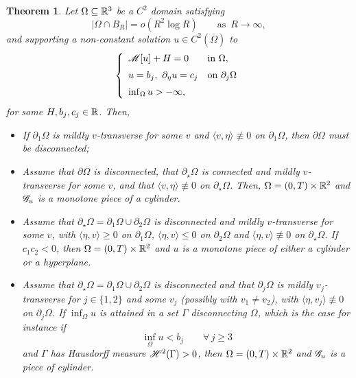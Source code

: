 \documentclass[10 pt,a4paper]{article}
\newtheorem{theorem}[definition]{Theorem}
\theoremstyle{definition}
\begin{document}
\begin{theorem}\label{teo_CMC_intro_R3}
	Let $\Omega \subseteq \mathbb R^3$ be a $C^2$ domain satisfying
	\begin{equation}\label{eq_quadraticgrowth}
		|\Omega \cap B_R| = o(R^2 \log R) \qquad \text{as } \, R \to \infty,
	\end{equation}
	and supporting a non-constant solution $u \in C^2(\overline\Omega)$ to 
	\[
		\left\{ 
		\begin{array}{ll}
			\mathscr{M}[u]  + H = 0 & \text{in } \Omega, \\[0.2cm]
			u = b_j, \ \partial_\eta u = c_j  & \text{on $\partial_j \Omega$} \\[0.2cm]
			\inf_\Omega u > -\infty,
		\end{array} \right.
	\]
	for some $H,b_j,c_j \in \mathbb R$. Then,   
	\begin{itemize}
		\item[(i)] If $\partial_1 \Omega$ is mildly $v$-transverse for some $v$ and $\langle v,\eta \rangle \not\equiv 0$ on $\partial_1 \Omega$, then $\partial \Omega$ must be disconnected;
		\item[(ii)] Assume that $\partial \Omega$ is disconnected, that $\partial_\star \Omega$ is connected and mildly $v$-transverse for some $v$, and that $\langle v,\eta \rangle \not\equiv 0$ on $\partial_\star \Omega$. Then, $\Omega = (0,T) \times \mathbb R^2$ and $\mathscr{G}_u$ is a monotone piece of a cylinder.
		\item[(iii)] Assume that $\partial_\star \Omega = \partial_1\Omega \cup \partial_2\Omega$ is disconnected and mildly $v$-transverse for some $v$, with $\langle \eta,v \rangle \ge 0$ on $\partial_1\Omega$, $\langle \eta,v \rangle \le 0$ on $\partial_2\Omega$ and $\langle \eta, v \rangle \not\equiv 0$ on $\partial_\star \Omega$. If $c_1c_2<0$, then $\Omega = (0,T) \times \mathbb R^2$ and $u$ is a monotone piece of either a cylinder or a hyperplane.
		\item[(iv)] Assume that $\partial_\star \Omega = \partial_1\Omega \cup \partial_2\Omega$ is disconnected and that $\partial_j \Omega$ is mildly $v_j$-transverse for $j \in \{1,2\}$ and some $v_j$ (possibly with $v_1 \neq v_2$), with $\langle \eta, v_j \rangle \not \equiv 0$ on $\partial_j\Omega$. If $\inf_\Omega u$ is attained in a set $\Gamma$ disconnecting $\Omega$, which is the case for instance if  
		\[
		\inf_\Omega u < b_j \qquad \forall \, j \ge 3 
		\]
		and $\Gamma$ has Hausdorff measure $\mathscr{H}^{2}(\Gamma)>0$, then $\Omega=(0,T) \times \mathbb R^2$ and $\mathscr{G}_u$ is a piece of cylinder.
	\end{itemize}
\end{theorem}
\end{document}
